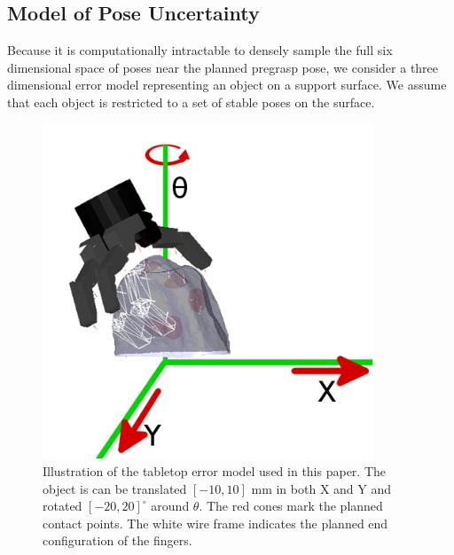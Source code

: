 \subsection{Model of Pose Uncertainty}
\label{sec:UncertaintyModel}
Because it is computationally intractable to densely sample the full six dimensional space of poses near the planned
pregrasp pose, we consider a three dimensional error model representing an object on a support surface. We assume that
each object is restricted to a set of stable poses on the surface.
\begin{figure}[b!]
\begin{centering}
\includegraphics[height = 100mm]{ErrorModelIllustration.png}
\caption{Illustration of the tabletop error model used in this paper.  The object is can be translated $[-10,10]$ mm in both X and Y and rotated $[-20,20]^\circ$ around $\theta$.  The red cones mark the planned contact points.  The white wire frame indicates the planned end configuration of the fingers.}
\label{fig:errormodelillustration}
\end{centering}
\end{figure}
